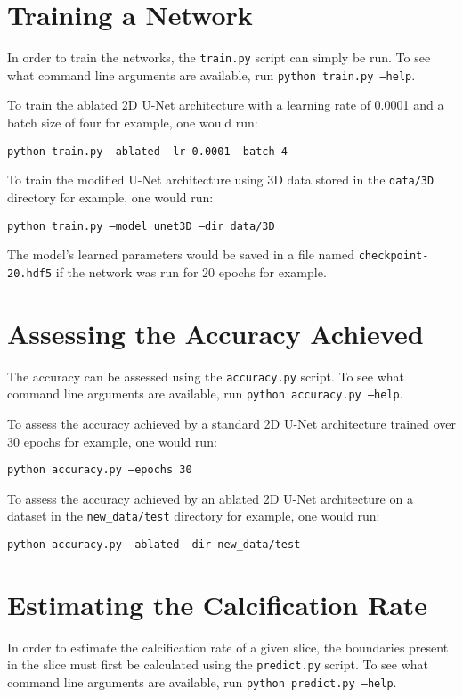 \section{Training a Network}

In order to train the networks, the \texttt{train.py} script can simply be run. To see what command line arguments are available, run \texttt{python train.py --help}.

To train the ablated 2D U-Net architecture with a learning rate of 0.0001 and a batch size of four for example, one would run:

\texttt{python train.py --ablated --lr 0.0001 --batch 4}

To train the modified U-Net architecture using 3D data stored in the \texttt{data/3D} directory for example, one would run:

\texttt{python train.py --model unet3D --dir data/3D}

The model's learned parameters would be saved in a file named \texttt{checkpoint-20.hdf5} if the network was run for 20 epochs for example.

\section{Assessing the Accuracy Achieved}

The accuracy can be assessed using the \texttt{accuracy.py} script. To see what command line arguments are available, run \texttt{python accuracy.py --help}.

To assess the accuracy achieved by a standard 2D U-Net architecture trained over 30 epochs for example, one would run:

\texttt{python accuracy.py --epochs 30}

To assess the accuracy achieved by an ablated 2D U-Net architecture on a dataset in the \texttt{new\_data/test} directory for example, one would run:

\texttt{python accuracy.py --ablated --dir new\_data/test}

\section{Estimating the Calcification Rate}

In order to estimate the calcification rate of a given slice, the boundaries present in the slice must first be calculated using the \texttt{predict.py} script. To see what command line arguments are available, run \texttt{python predict.py --help}.

